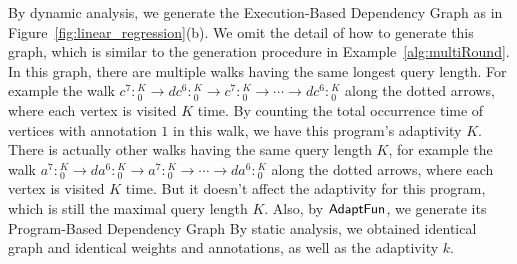 %
By dynamic analysis, we generate the Execution-Based Dependency Graph as in Figure~\ref{fig:linear_regression}(b). We omit the detail of how to 
generate this graph, which is similar to the generation procedure in 
Example~\ref{alg:multiRound}.
In this graph, there are multiple walks having the same longest query length.
For example the walk $c^7:{}^K_0 \to dc^6 : {}^K_0 \to c^7:{}^K_0 \to \cdots \to dc^6 : {}^K_0$ along the 
dotted arrows, where each vertex is visited $K$ time.
By counting the total occurrence time of vertices with annotation $1$ in this walk, we have this program's adaptivity $K$.
There is actually other walks having the same query length $K$, for example the 
walk $a^7:{}^K_0 \to da^6 : {}^K_0 \to a^7:{}^K_0 \to \cdots \to da^6 : {}^K_0$ along the 
dotted arrows, where each vertex is visited $K$ time.
But it doesn't affect the adaptivity for this program, which is still the maximal query length $K$.
Also, by $\textsf{AdaptFun}$, we generate its Program-Based Dependency Graph
%
By static analysis, we obtained identical graph and identical weights and annotations, as well as the adaptivity $k$.
%
